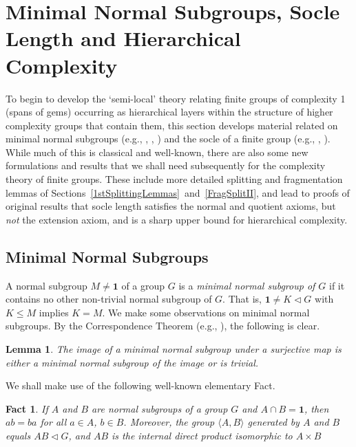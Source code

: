 \documentclass[a4paper,11pt]{amsart}
\newtheorem{lemma}[theorem]{Lemma}
\newtheorem{fact}[theorem]{Fact}
\theoremstyle{definition}
\newcommand{\1}{{\mathbf 1}}
\begin{document}
\section{Minimal Normal Subgroups, Socle Length and Hierarchical Complexity}\label{MinSocHier}
 To begin to develop the `semi-local' theory relating finite groups of complexity 1 (spans of gems) occurring as hierarchical layers within the structure of higher complexity groups that contain them, this section develops material related on minimal normal subgroups (e.g., \cite{Hall}, \cite{DixonMortimer}, \cite{Rotman})  and the socle of a finite group (e.g.,  \cite{DixonMortimer}, \cite{CannonHolt}).
While much of this is classical and well-known,  there are also some new formulations and results that we shall need subsequently for the complexity theory of finite groups. These include more detailed splitting and fragmentation lemmas of Sections~\ref{1stSplittingLemmas}~and~\ref{FragSplitII},  and lead to proofs of original results that socle length satisfies the normal and quotient axioms, but {\em not} the extension axiom, and is a sharp upper bound for hierarchical complexity. 


 \subsection{Minimal Normal Subgroups}
 A normal subgroup $M\neq \1$ of a group $G$ is a {\em minimal normal subgroup of $G$} if  it contains no other non-trivial normal subgroup of $G$. That is,  $\1 \neq K \lhd G$  with  $K \leq M$ implies $K=M$.
 We make some observations on minimal normal subgroups.  By the Correspondence Theorem (e.g., \cite[Theorem 2.28]{Rotman}), the following is clear.

 \begin{lemma}\label{Min}
The image of a minimal normal subgroup under a surjective map is either a minimal normal subgroup of the image or is trivial.
\end{lemma}

 We shall make use of the following well-known elementary Fact. 
 
  \begin{fact}\label{elemLemma}
   If $A$ and $B$ are normal subgroups of a group $G$ and $A\cap B=\1$, then $ab=ba$ for all $a\in A$, $b\in B$. Moreover, the group $\langle A, B\rangle$ generated by $A$ and $B$ equals $AB \lhd G$, and $AB$ is the internal direct product isomorphic to $A \times B$ \end{fact}
   
\end{document}
